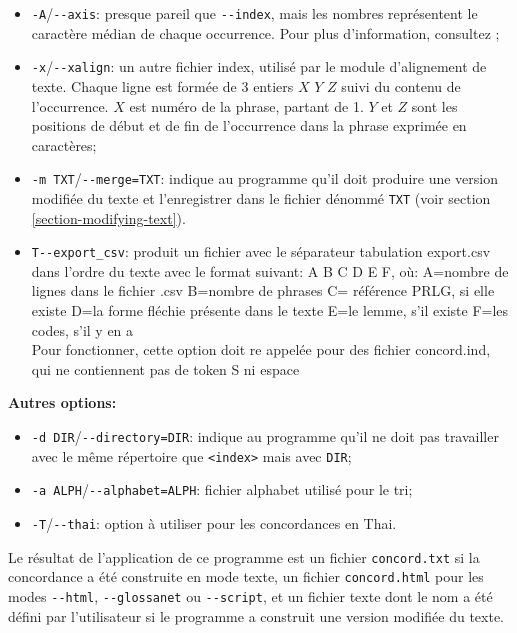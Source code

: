 \begin{itemize}
\item \verb+-A+/\verb+--axis+: presque pareil que \verb+--index+, mais les nombres
	représentent le caractère médian de chaque occurrence. Pour plus d'information,
	consultez \cite{axis};
\item \verb+-x+/\verb+--xalign+: un autre fichier index, utilisé par le module d'alignement de
	texte.
	Chaque ligne est formée de 3 entiers $X$ $Y$ $Z$ suivi du contenu de l'occurrence.
	$X$ est numéro de la phrase, partant de 1. $Y$ et $Z$ sont les positions de début et de fin
	de l'occurrence dans la phrase exprimée en caractères;
\item \verb+-m TXT+/\verb+--merge=TXT+: indique au programme qu'il doit produire une version
	modifiée du texte et l'enregistrer dans le fichier dénommé
	\verb+TXT+ (voir section \ref{section-modifying-text}).
	
\item  \verb+T--export_csv+: produit un fichier avec le séparateur tabulation export.csv dans l'ordre du texte avec le 
	format suivant:
	\subitem A B C D E F, où:
	\subitem  A=nombre de lignes dans le fichier .csv
	\subitem  B=nombre de phrases
	\subitem  C= référence PRLG, si elle existe
	\subitem  D=la forme fléchie présente dans le texte
	\subitem  E=le lemme, s'il existe
	\subitem  F=les codes, s'il y en a\\
	Pour fonctionner, cette option doit re appelée pour des fichier concord.ind, qui ne contiennent pas de token
	{S} ni espace
\end{itemize}

\bigskip
\noindent \textbf{Autres options:}
\begin{itemize}
\item \verb+-d DIR+/\verb+--directory=DIR+: indique au programme qu'il ne doit pas travailler avec
	le même répertoire que \verb+<index>+ mais avec \verb+DIR+;
  \item \verb+-a ALPH+/\verb+--alphabet=ALPH+: fichier alphabet utilisé pour le tri;
  \item \verb+-T+/\verb+--thai+: option à utiliser pour les concordances en Thai.
\end{itemize}

\bigskip
\noindent Le résultat de l’application de ce programme est un fichier \verb+concord.txt+
si la concordance a été construite en mode texte, un fichier \verb+concord.html+ pour les modes
 \verb+--html+, \verb+--glossanet+ ou \verb$--script$, et un fichier texte dont le nom a été
défini par l’utilisateur si le programme a construit une version modifiée du texte.


